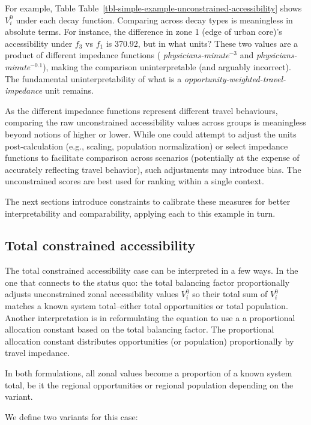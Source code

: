 \documentclass[
  10pt,
  letterpaper,
]{article}
\begin{document}
For example, Table
Table~\ref{tbl-simple-example-unconstrained-accessibility} shows
\(V^0_{i}\) under each decay function. Comparing across decay types is
meaningless in absolute terms. For instance, the difference in zone 1
(edge of urban core)'s accessibility under \(f_3\) vs \(f_1\) is 370.92,
but in what units? These two values are a product of different impedance
functions ( \emph{physicians-minute\(^{-3}\)} and
\emph{physicians-minute\(^{-0.1}\)}), making the comparison
uninterpretable (and arguably incorrect). The fundamental
uninterpretability of what is a
\emph{opportunity-weighted-travel-impedance} unit remains.

As the different impedance functions represent different travel
behaviours, comparing the raw unconstrained accessibility values across
groups is meaningless beyond notions of higher or lower. While one could
attempt to adjust the units post-calculation (e.g., scaling, population
normalization) or select impedance functions to facilitate comparison
across scenarios (potentially at the expense of accurately reflecting
travel behavior), such adjustments may introduce bias. The unconstrained
scores are best used for ranking within a single context.

The next sections introduce constraints to calibrate these measures for
better interpretability and comparability, applying each to this example
in turn.

\subsection{Total constrained
accessibility}\label{total-constrained-accessibility}

The total constrained accessibility case can be interpreted in a few
ways. In the one that connects to the status quo: the total balancing
factor proportionally adjusts unconstrained zonal accessibility values
\(V^0_i\) so their total sum of \(V^0_i\) matches a known system
total--either total opportunities or total population. Another
interpretation is in reformulating the equation to use a a proportional
allocation constant based on the total balancing factor. The
proportional allocation constant distributes opportunities (or
population) proportionally by travel impedance.

In both formulations, all zonal values become a proportion of a known
system total, be it the regional opportunities or regional population
depending on the variant.

We define two variants for this case:
\end{document}
